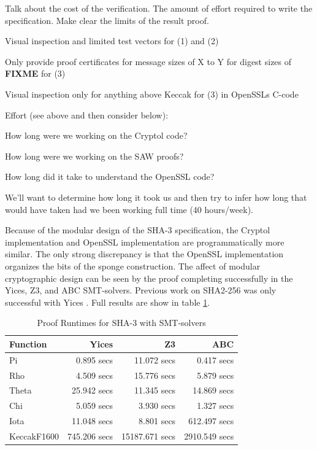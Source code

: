 Talk about the cost of the verification. The amount of effort required to write the specification. Make clear the limits of the result proof.

\begin{compactitem}
\item Visual inspection and limited test vectors for (1) and (2)
\item Only provide proof certificates for message sizes of X to Y for digest sizes of \textbf{FIXME} for (3)
\item Visual inspection only for anything above Keccak for (3) in OpenSSLs C-code
\end{compactitem}

Effort (see above and then consider below):
\begin{compactitem}
 \item How long were we working on the Cryptol code?
 \item How long were we working on the SAW proofs?
 \item How long did it take to understand the OpenSSL code?
\end{compactitem}
We'll want to determine how long it took us and then try to infer how long that would have taken had we been working full time (40 hours/week).

Because of the modular design of the SHA-3 specification, the Cryptol implementation and OpenSSL implementation are programmatically more similar. 
The only strong discrepancy is that the OpenSSL implementation organizes the bits of the sponge construction. 
The affect of modular cryptographic design can be seen by the proof completing successfully in the Yices, Z3, and ABC SMT-solvers. 
Previous work on SHA2-256 was only successful with Yices \cite{nfm-us}. Full results are show in table \ref{finaltable}. 

\begin{table}[b]
\caption{Proof Runtimes for SHA-3 with SMT-solvers}\label{finaltable}
\setlength{\tabcolsep}{13.5pt}
\begin{tabular}{|l|r|r|r|}
\hline
\textbf{Function} & \textbf{Yices} & \textbf{Z3} & \textbf{ABC} \\
\hline
Pi          &   0.895 secs &    11.072 secs &    0.417 secs \\
Rho         &   4.509 secs &    15.776 secs &    5.879 secs \\
Theta       &  25.942 secs &    11.345 secs &   14.869 secs \\
Chi         &   5.059 secs &     3.930 secs &    1.327 secs \\
Iota        &  11.048 secs &     8.801 secs &  612.497 secs \\
KeccakF1600 & 745.206 secs & 15187.671 secs & 2910.549 secs \\
\hline
\end{tabular}
\end{table}
